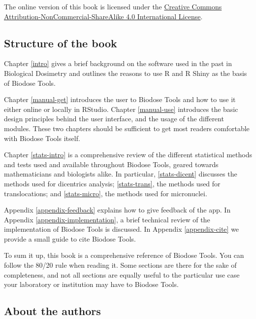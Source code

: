 \documentclass[]{scrartcl}
\begin{document}
The online version of this book is licensed under the \href{http://creativecommons.org/licenses/by-nc-sa/4.0/}{Creative Commons Attribution-NonCommercial-ShareAlike 4.0 International License}.

\newpage

\hypertarget{structure-of-the-book}{%
\subsection*{Structure of the book}\label{structure-of-the-book}}

Chapter \ref{intro} gives a brief background on the software used in the past in Biological Dosimetry and outlines the reasons to use R and R Shiny as the basis of Biodose Tools.

Chapter \ref{manual-get} introduces the user to Biodose Tools and how to use it either online or locally in RStudio. Chapter \ref{manual-use} introduces the basic design principles behind the user interface, and the usage of the different modules. These two chapters should be sufficient to get most readers comfortable with Biodose Tools itself.

Chapter \ref{stats-intro} is a comprehensive review of the different statistical methods and tests used and available throughout Biodose Tools, geared towards mathematicians and biologists alike. In particular, \ref{stats-dicent} discusses the methods used for dicentrics analysis; \ref{stats-trans}, the methods used for translocations; and \ref{stats-micro}, the methods used for micronuclei.

Appendix \ref{appendix-feedback} explains how to give feedback of the app. In Appendix \ref{appendix-implementation}, a brief technical review of the implementation of Biodose Tools is discussed. In Appendix \ref{appendix-cite} we provide a small guide to cite Biodose Tools.

To sum it up, this book is a comprehensive reference of Biodose Tools. You can follow the 80/20 rule when reading it. Some sections are there for the sake of completeness, and not all sections are equally useful to the particular use case your laboratory or institution may have to Biodose Tools.

\newpage

\hypertarget{about-the-authors}{%
\subsection*{About the authors}\label{about-the-authors}}
\end{document}
